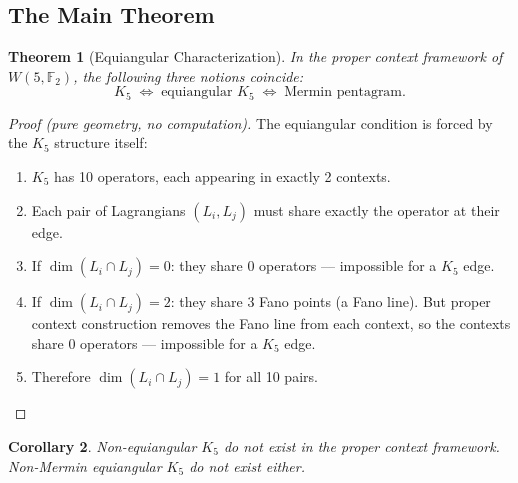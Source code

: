 \documentclass[11pt,a4paper]{article}
\newtheorem{theorem}{Theorem}[section]
\newtheorem{corollary}[theorem]{Corollary}
\theoremstyle{remark}
\newcommand{\F}{\mathbb{F}}
\begin{document}
\subsection{The Main Theorem}

\begin{theorem}[Equiangular Characterization]
\label{thm:equiangular}
In the proper context framework of $W(5, \F_2)$, the following three
notions coincide:
\[
K_5 \;\Longleftrightarrow\; \text{equiangular } K_5
\;\Longleftrightarrow\; \text{Mermin pentagram}.
\]
\end{theorem}

\begin{proof}[Proof (pure geometry, no computation)]
The equiangular condition is forced by the $K_5$ structure itself:

\begin{enumerate}
  \item $K_5$ has 10 operators, each appearing in exactly 2 contexts.
  \item Each pair of Lagrangians $(L_i, L_j)$ must share exactly the
    operator at their edge.
  \item If $\dim(L_i \cap L_j) = 0$: they share 0 operators ---
    impossible for a $K_5$ edge.
  \item If $\dim(L_i \cap L_j) = 2$: they share 3 Fano points (a Fano
    line). But proper context construction removes the Fano line from
    each context, so the contexts share 0 operators --- impossible for
    a $K_5$ edge.
  \item Therefore $\dim(L_i \cap L_j) = 1$ for all 10 pairs. \qedhere
\end{enumerate}
\end{proof}

\begin{corollary}
Non-equiangular $K_5$ do not exist in the proper context framework.
Non-Mermin equiangular $K_5$ do not exist either.
\end{corollary}
\end{document}
